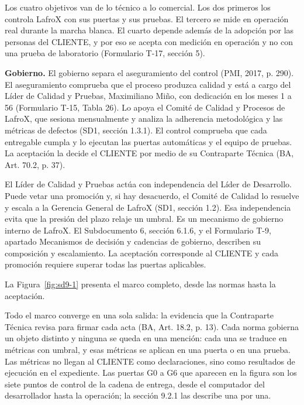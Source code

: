 Los cuatro objetivos van de lo técnico a lo comercial. Los dos primeros los controla LafroX con sus puertas y sus pruebas. El tercero se mide en operación real durante la marcha blanca. El cuarto depende además de la adopción por las personas del CLIENTE, y por eso se acepta con medición en operación y no con una prueba de laboratorio (Formulario T-17, sección 5).

\textbf{Gobierno.} El gobierno separa el aseguramiento del control (PMI, 2017, p. 290). El aseguramiento comprueba que el proceso produzca calidad y está a cargo del Líder de Calidad y Pruebas, Maximiliano Miño, con dedicación en los meses 1 a 56 (Formulario T-15, Tabla 26). Lo apoya el Comité de Calidad y Procesos de LafroX, que sesiona mensualmente y analiza la adherencia metodológica y las métricas de defectos (SD1, sección 1.3.1). El control comprueba que cada entregable cumpla y lo ejecutan las puertas automáticas y el equipo de pruebas. La aceptación la decide el CLIENTE por medio de su Contraparte Técnica (BA, Art. 70.2, p. 37).

El Líder de Calidad y Pruebas actúa con independencia del Líder de Desarrollo. Puede vetar una promoción y, si hay desacuerdo, el Comité de Calidad lo resuelve y escala a la Gerencia General de LafroX (SD1, sección 1.2). Esa independencia evita que la presión del plazo relaje un umbral. Es un mecanismo de gobierno interno de LafroX. El Subdocumento 6, sección 6.1.6, y el Formulario T-9, apartado Mecanismos de decisión y cadencias de gobierno, describen su composición y escalamiento. La aceptación corresponde al CLIENTE y cada promoción requiere superar todas las puertas aplicables.

La Figura~\ref{fig:sd9-1} presenta el marco completo, desde las normas hasta la aceptación.


Todo el marco converge en una sola salida: la evidencia que la Contraparte Técnica revisa para firmar cada acta (BA, Art. 18.2, p. 13). Cada norma gobierna un objeto distinto y ninguna se queda en una mención: cada una se traduce en métricas con umbral, y esas métricas se aplican en una puerta o en una prueba. Las métricas no llegan al CLIENTE como declaraciones, sino como resultados de ejecución en el expediente. Las puertas G0 a G6 que aparecen en la figura son los siete puntos de control de la cadena de entrega, desde el computador del desarrollador hasta la operación; la sección 9.2.1 las describe una por una.

